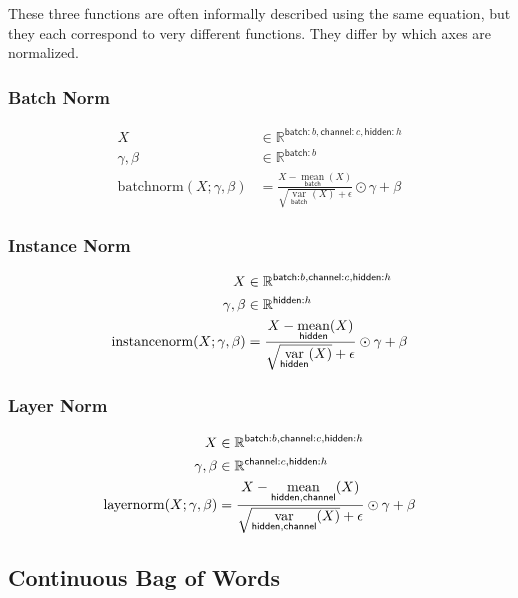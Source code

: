 \documentclass{article}
\newcommand{\name}[1]{\mathsf{#1}}
\newcommand{\nfun}[2]{\mathop{\text{#2}}\limits_{\name{#1}}}
\newcommand{\reals}{\mathbb{R}}
\begin{document}
These three functions are often informally described using the same
equation, but they each correspond to very different functions. They differ
by which axes are normalized.

\subsubsection*{Batch Norm}

\begin{align*} 
X &\in \reals^{{\name{batch}:b, \name{channel}:c, \name{hidden}:h}}\\
\gamma, \beta &\in \reals^{{\name{batch}:b}} \\
\text{batchnorm}(X; \gamma, \beta) &= \frac{X - \nfun{batch}{mean}(X)}{\sqrt{\nfun{batch}{var}(X)} + \epsilon } \odot \gamma + \beta
\end{align*}


\subsubsection*{Instance Norm}

\begin{align*} 
X &\in \reals^{{\name{batch}:b, \name{channel}:c, \name{hidden}:h}}\\
\gamma, \beta &\in \reals^{{\name{hidden}:h}} \\
\text{instancenorm}(X; \gamma, \beta) &= \frac{X - \nfun{hidden}{\text{mean}}(X)}{\sqrt{\nfun{hidden}{\text{var}}(X)} + \epsilon } \odot \gamma + \beta
\end{align*}

\subsubsection*{Layer Norm}

\begin{align*} 
X &\in \reals^{{\name{batch}:b, \name{channel}:c, \name{hidden}:h}} \\
\gamma, \beta &\in \reals^{{\name{channel}:c, \name{hidden}:h}} \\
\text{layernorm}(X; \gamma, \beta) &= \frac{X - \nfun{hidden,channel}{\text{mean}}(X)}{\sqrt{\nfun{hidden, channel}{\text{var}}(X)} + \epsilon } \odot \gamma + \beta 
\end{align*}


\subsection{Continuous Bag of Words}
\end{document}
